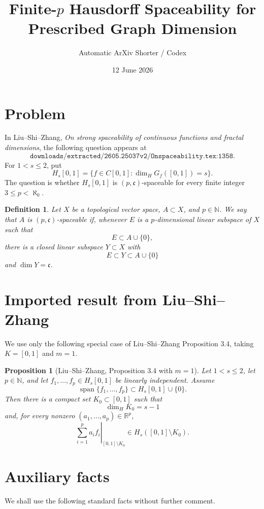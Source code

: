 \documentclass[11pt]{article}
\title{Finite-\(p\) Hausdorff Spaceability for Prescribed Graph Dimension}
\author{Automatic ArXiv Shorter / Codex}
\date{12 June 2026}
\newtheorem*{proposition}{Proposition}
\newtheorem*{definition}{Definition}
\newcommand{\NN}{\mathbb N}
\newcommand{\RR}{\mathbb R}
\newcommand{\cc}{\mathfrak c}
\newcommand{\dimH}{\dim_{\!H}}
\newcommand{\spanop}{\operatorname{span}}
\begin{document}
\maketitle

\section*{Problem}

In Liu--Shi--Zhang, \emph{On strong spaceability of continuous functions and fractal dimensions}, the following question appears at
\[
\texttt{downloads/extracted/2605.25037v2/Onspaceability.tex:1358}.
\]
For \(1<s\leq2\), put
\[
H_s[0,1]=\{f\in C[0,1]:\dimH G_f([0,1])=s\}.
\]
The question is whether \(H_s[0,1]\) is \((p,\cc)\)-spaceable for every finite integer \(3\leq p<\aleph_0\).

\begin{definition}
Let \(X\) be a topological vector space, \(A\subset X\), and \(p\in\NN\).  We say that \(A\) is \((p,\cc)\)-spaceable if, whenever \(E\) is a \(p\)-dimensional linear subspace of \(X\) such that
\[
E\subset A\cup\{0\},
\]
there is a closed linear subspace \(Y\subset X\) with
\[
E\subset Y\subset A\cup\{0\}
\]
and \(\dim Y=\cc\).
\end{definition}

\section*{Imported result from Liu--Shi--Zhang}

We use only the following special case of Liu--Shi--Zhang Proposition 3.4, taking \(K=[0,1]\) and \(m=1\).

\begin{proposition}[Liu--Shi--Zhang, Proposition 3.4 with \(m=1\)]
Let \(1<s\leq2\), let \(p\in\NN\), and let \(f_1,\ldots,f_p\in H_s[0,1]\) be linearly independent.  Assume
\[
\spanop\{f_1,\ldots,f_p\}\subset H_s[0,1]\cup\{0\}.
\]
Then there is a compact set \(K_0\subset[0,1]\) such that
\[
\dimH K_0=s-1
\]
and, for every nonzero \((a_1,\ldots,a_p)\in\RR^p\),
\[
\left.\sum_{i=1}^p a_i f_i\right|_{[0,1]\setminus K_0}
\in H_s([0,1]\setminus K_0).
\]
\end{proposition}

\section*{Auxiliary facts}

We shall use the following standard facts without further comment.
\end{document}
